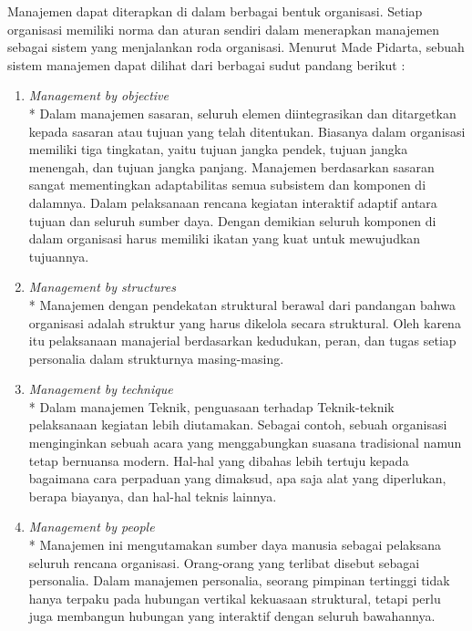 Manajemen dapat diterapkan di dalam berbagai bentuk organisasi. Setiap organisasi memiliki norma dan aturan sendiri dalam menerapkan manajemen sebagai sistem yang menjalankan roda organisasi. Menurut Made Pidarta, sebuah sistem manajemen dapat dilihat dari berbagai sudut pandang berikut \cite{athhoillah} :

\begin{enumerate}
	\item \emph{Management by objective} \\*
	Dalam manajemen sasaran, seluruh elemen diintegrasikan dan ditargetkan kepada sasaran atau tujuan yang telah ditentukan. Biasanya dalam organisasi memiliki tiga tingkatan, yaitu tujuan jangka pendek, tujuan jangka menengah, dan tujuan jangka panjang. Manajemen berdasarkan sasaran sangat mementingkan adaptabilitas semua subsistem dan komponen di dalamnya. Dalam pelaksanaan rencana kegiatan interaktif adaptif antara tujuan dan seluruh sumber daya. Dengan demikian seluruh komponen di dalam organisasi harus memiliki ikatan yang kuat untuk mewujudkan tujuannya. 
	
	\item \emph{Management by structures} \\*
	Manajemen dengan pendekatan struktural berawal dari pandangan bahwa organisasi adalah struktur yang harus dikelola secara struktural. Oleh karena itu pelaksanaan manajerial berdasarkan kedudukan, peran, dan tugas setiap personalia dalam strukturnya masing-masing.
	
	\item \emph{Management by technique} \\*
	Dalam manajemen Teknik, penguasaan terhadap Teknik-teknik pelaksanaan kegiatan lebih diutamakan. Sebagai contoh, sebuah organisasi menginginkan sebuah acara yang menggabungkan suasana tradisional namun tetap bernuansa modern. Hal-hal yang dibahas lebih tertuju kepada bagaimana cara perpaduan yang dimaksud, apa saja alat yang diperlukan, berapa biayanya, dan hal-hal teknis lainnya.
	
	\item \emph{Management by people} \\*
	Manajemen ini mengutamakan sumber daya manusia sebagai pelaksana seluruh rencana organisasi. Orang-orang yang terlibat disebut sebagai personalia. Dalam manajemen personalia, seorang pimpinan tertinggi tidak hanya terpaku pada hubungan vertikal kekuasaan struktural, tetapi perlu juga membangun hubungan yang interaktif dengan seluruh bawahannya.
	

\end{enumerate}
